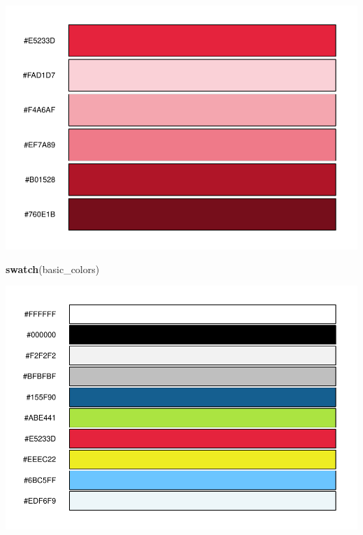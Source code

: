 \documentclass[
]{article}
\newenvironment{Shaded}{\begin{snugshade}}{\end{snugshade}}
\newcommand{\DecValTok}[1]{\textcolor[rgb]{0.00,0.00,0.81}{#1}}
\newcommand{\KeywordTok}[1]{\textcolor[rgb]{0.13,0.29,0.53}{\textbf{#1}}}
\newcommand{\NormalTok}[1]{#1}
\newcommand{\OperatorTok}[1]{\textcolor[rgb]{0.81,0.36,0.00}{\textbf{#1}}}
\newcommand{\StringTok}[1]{\textcolor[rgb]{0.31,0.60,0.02}{#1}}
\begin{document}
\begin{Shaded}
\end{Shaded}

\includegraphics[width=1\linewidth]{man/figures/README-unnamed-chunk-2-3}

\begin{Shaded}
\begin{Highlighting}[]
\KeywordTok{swatch}\NormalTok{(basic\_colors)}
\end{Highlighting}
\end{Shaded}

\includegraphics[width=1\linewidth]{man/figures/README-unnamed-chunk-2-4}
\end{document}
